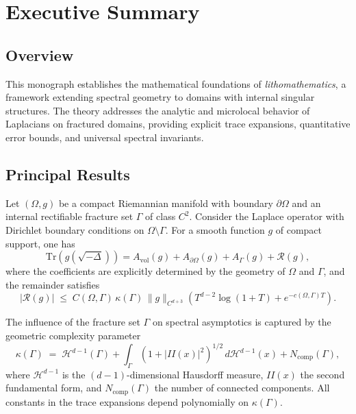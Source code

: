 
\chapter*{Executive Summary}
\label{chap:executive-summary}

\section*{Overview}

This monograph establishes the mathematical foundations of \emph{lithomathematics}, 
a framework extending spectral geometry to domains with internal singular structures. 
The theory addresses the analytic and microlocal behavior of Laplacians on fractured 
domains, providing explicit trace expansions, quantitative error bounds, and universal 
spectral invariants.

\section*{Principal Results}

\begin{theorem} \label{thm:trace}
Let $(\Omega,g)$ be a compact Riemannian manifold with boundary $\partial\Omega$ and 
an internal rectifiable fracture set $\Gamma$ of class $C^2$. Consider the Laplace 
operator with Dirichlet boundary conditions on $\Omega\setminus\Gamma$. For a smooth 
function $g$ of compact support, one has
\[
    \mathrm{Tr}(g(\sqrt{-\Delta})) 
    = A_{\mathrm{vol}}(g) + A_{\partial\Omega}(g) + A_{\Gamma}(g) + \mathcal{R}(g),
\]
where the coefficients are explicitly determined by the geometry of $\Omega$ and $\Gamma$, 
and the remainder satisfies
\[
    |\mathcal{R}(g)| 
    \;\leq\; C(\Omega,\Gamma)\,\kappa(\Gamma)\,\|g\|_{C^{d+3}}
        \left( T^{d-2}\log(1+T) + e^{-c(\Omega,\Gamma) T}\right).
\]
\end{theorem}

\begin{theorem} \label{thm:complexity}
The influence of the fracture set $\Gamma$ on spectral asymptotics is captured by the 
geometric complexity parameter
\[
    \kappa(\Gamma) \;=\; 
        \mathcal{H}^{d-1}(\Gamma) 
        + \int_\Gamma (1+|II(x)|^2)^{1/2}\,d\mathcal{H}^{d-1}(x) 
        + N_{\mathrm{comp}}(\Gamma),
\]
where $\mathcal{H}^{d-1}$ is the $(d-1)$-dimensional Hausdorff measure, $II(x)$ the 
second fundamental form, and $N_{\mathrm{comp}}(\Gamma)$ the number of connected 
components. All constants in the trace expansions depend polynomially on $\kappa(\Gamma)$.
\end{theorem}

